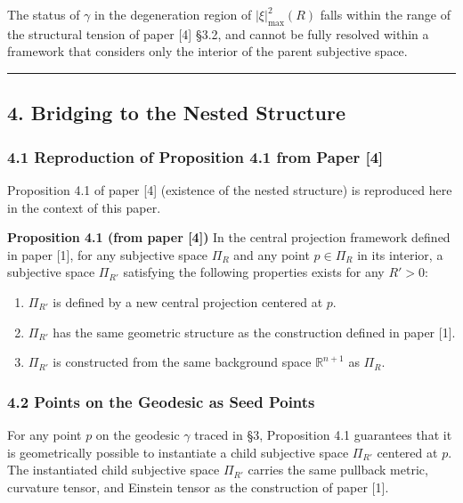 \documentclass[a4paper,11pt]{article}
\theoremstyle{definition}
\providecommand{\tightlist}{\setlength{\itemsep}{0pt}\setlength{\parskip}{0pt}}
\begin{document}
The status of \(\gamma\) in the degeneration region of \(|\xi|^2_{\max}(R)\) falls within the range of the structural tension of paper {[}4{]} §3.2, and cannot be fully resolved within a framework that considers only the interior of the parent subjective space.

\begin{center}\rule{0.5\linewidth}{0.5pt}\end{center}

\subsection{4. Bridging to the Nested Structure}\label{bridging-to-the-nested-structure}

\subsubsection{4.1 Reproduction of Proposition 4.1 from Paper {[}4{]}}\label{reproduction-of-proposition-4.1-from-paper-4}

Proposition 4.1 of paper {[}4{]} (existence of the nested structure) is reproduced here in the context of this paper.

\textbf{Proposition 4.1 (from paper {[}4{]})} In the central projection framework defined in paper {[}1{]}, for any subjective space \(\Pi_R\) and any point \(p \in \Pi_R\) in its interior, a subjective space \(\Pi_{R'}\) satisfying the following properties exists for any \(R' > 0\):

\begin{enumerate}
\def\labelenumi{\arabic{enumi}.}
\tightlist
\item
  \(\Pi_{R'}\) is defined by a new central projection centered at \(p\).
\item
  \(\Pi_{R'}\) has the same geometric structure as the construction defined in paper {[}1{]}.
\item
  \(\Pi_{R'}\) is constructed from the same background space \(\mathbb{R}^{n+1}\) as \(\Pi_R\).
\end{enumerate}

\subsubsection{4.2 Points on the Geodesic as Seed Points}\label{points-on-the-geodesic-as-seed-points}

For any point \(p\) on the geodesic \(\gamma\) traced in §3, Proposition 4.1 guarantees that it is geometrically possible to instantiate a child subjective space \(\Pi_{R'}\) centered at \(p\). The instantiated child subjective space \(\Pi_{R'}\) carries the same pullback metric, curvature tensor, and Einstein tensor as the construction of paper {[}1{]}.
\end{document}
